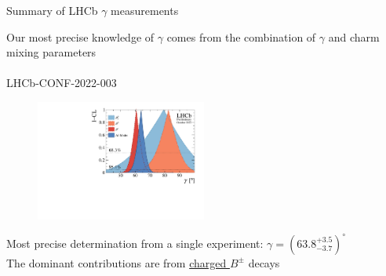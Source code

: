 \documentclass[xcolor={dvipsnames}]{beamer}
\begin{document}
\begin{frame}{Summary of LHCb \texorpdfstring{$\gamma$}{gamma} measurements}
  \begin{center}
    {\Large Our most precise knowledge of $\gamma$ comes from the combination of $\gamma$ and charm mixing parameters}\\~\\
    {\large LHCb-CONF-2022-003}
  \end{center}
  \begin{figure}
    \includegraphics[width=0.5\textwidth]{Plots/gammacharm_lhcb_comp_flavour.pdf}
  \end{figure}
  \vspace{-0.5cm}
  \begin{center}
    Most precise determination from a single experiment: $\gamma = (63.8^{+3.5}_{-3.7})^\circ$\\
    The dominant contributions are from \underline{charged $B^\pm$} decays
  \end{center}
\end{frame}
\end{document}
